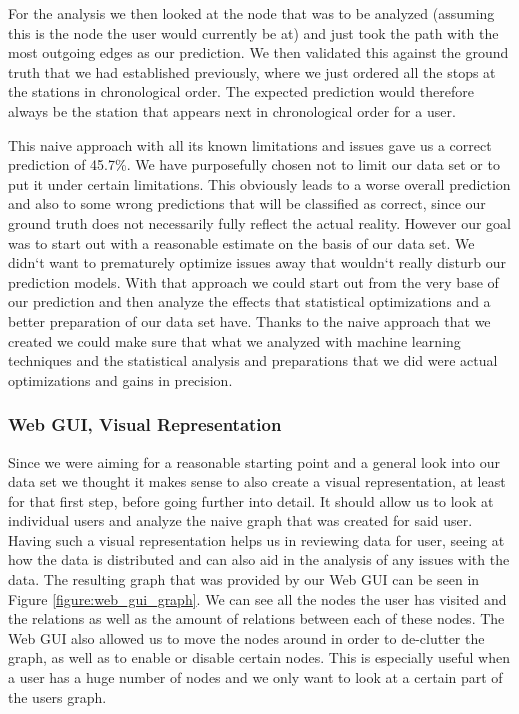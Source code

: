 For the analysis we then looked at the node that was to be analyzed (assuming this is the node the user would currently be at) and just took the path with the most outgoing edges as our prediction. We then validated this against the ground truth that we had established previously, where we just ordered all the stops at the stations in chronological order. The expected prediction would therefore always be the station that appears next in chronological order for a user. 

This naive approach with all its known limitations and issues gave us a correct prediction of 45.7\%. We have purposefully chosen not to limit our data set or to put it under certain limitations. This obviously leads to a worse overall prediction and also to some wrong predictions that will be classified as correct, since our ground truth does not necessarily fully reflect the actual reality. However our goal was to start out with a reasonable estimate on the basis of our data set. We didn`t want to prematurely optimize issues away that wouldn`t really disturb our prediction models. With that approach we could start out from the very base of our prediction and then analyze the effects that statistical optimizations and a better preparation of our data set have. Thanks to the naive approach that we created we could make sure that what we analyzed with machine learning techniques and the statistical analysis and preparations that we did were actual optimizations and gains in precision.

\subsubsection{Web GUI, Visual Representation}
\label{subsubsec:web_gui}
Since we were aiming for a reasonable starting point and a general look into our data set we thought it makes sense to also create a visual representation, at least for that first step, before going further into detail. It should allow us to look at individual users and analyze the naive graph that was created for said user. Having such a visual representation helps us in reviewing data for user, seeing at how the data is distributed and can also aid in the analysis of any issues with the data. The resulting graph that was provided by our Web GUI can be seen in Figure \ref{figure:web_gui_graph}. We can see all the nodes the user has visited and the relations as well as the amount of relations between each of these nodes. The Web GUI also allowed us to move the nodes around in order to de-clutter the graph, as well as to enable or disable certain nodes. This is especially useful when a user has a huge number of nodes and we only want to look at a certain part of the users graph.

